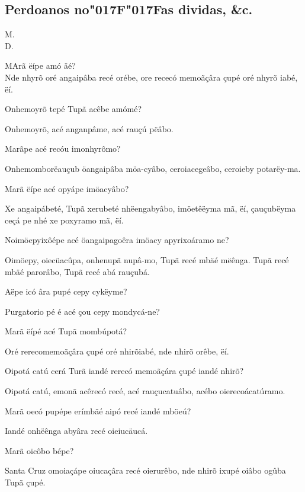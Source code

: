 \documentclass[openany,titlepage,12pt]{book}
\newcommand{\lgSS}{\char"017F\char"017F}
\newcommand{\comecalista}[5]{
    \hspace*{-11.7pt}
    \begin{minipage}[t]{0.08\linewidth}
        \flushright #1\\#2
    \end{minipage}
    \hspace{0pt}
    \begin{minipage}[t]{0.94\linewidth}
        \lettrine
        [findent =2pt, nindent=0pt,  lines=2]
        {#3}{#4}#5
    \end{minipage}
    \vspace*{-3pt}
}
\begin{document}
\subsection{Perdoanos no\lgSS as dividas, \&c.}
\unskip\vspace*{-0.7\baselineskip}
\comecalista{M.}{D.}{M}{A}
{rã ëípe amó äé?\\ Nde nhyrõ oré angaipâba recé
orébe, ore rececó memoãçâra çupé oré nhyrõ iabé, ëí.}
\begin{alternate}
    \item Onhemoyrõ tepé Tupã acêbe amómé?
    \item Onhemoyrõ, acé anganpâme, acé rauçú pëâbo.
    \item Marãpe acé recóu imonhyrômo?
    \item Onhemomborëauçub öangaipâba möa-cyâbo,
    ceroiacegeâbo, ceroieby potarëy-\linebreak ma.
    \item Marã ëípe acé opyápe imöacyâbo?
    \item Xe angaipábeté, Tupã xerubeté nhëengabyâbo,
    imöetêëyma mã, ëí, çauçubëyma ceçá pe
    nhé xe poxyramo mã, ëí.
    \item Noimöepyixôépe acé öangaipagoêra imöacy
    apyrixoáramo ne?
    \item Oimöepy, oiecüacûpa, onhenupã nupâ-mo, Tupã recé
    mbäé mëênga. Tupã recé mbäé parorâbo, Tupã recé abá
    rauçubá.
    \item Aëpe icó âra pupé cepy cykëyme?
    \item Purgatorio pé é acé çou cepy mondycá-ne?
    \item Marã ëípé acé Tupã mombúpotá?
    \item Oré rerecomemoãçâra çupé oré nhirõ\linebreak iabé,
    nde nhirõ orêbe, ëí.
    \item Oipotá catú cerá Turã iandé rerecó memoãçára
    çupé iandé nhirõ?
    \item Oipotá catú, emonã acêrecó recé, acé rauçucatuâbo,
    acébo oierecoácatúramo. 
    \item Marã oecó pupépe erímbäé aipó recé iandé mböeú?
    \item Iandé onhëênga abyâra recé oieiucäucá.
    \item Marã oicôbo bépe?
    \item Santa Cruz omoiaçápe oiucaçâra recé\linebreak
    oierurêbo, nde nhirõ ixupé oiâbo ogûba Tupã çupé.
\end{alternate}
\unskip\vspace*{-0.7\baselineskip}
\end{document}
